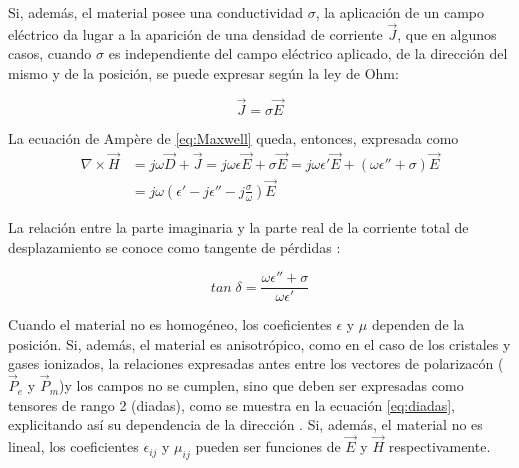 Si, además, el material posee una conductividad $\sigma$, la aplicación de un campo eléctrico da lugar a la aparición de una densidad de corriente $\vec{J}$, que en algunos casos, cuando $\sigma$ es independiente del campo eléctrico aplicado, de la dirección del mismo y de la posición, se puede expresar según la ley de Ohm:

\begin{equation}
	\label{eq:ohms_law}
	\vec{J} = \sigma \vec{E}
\end{equation}

La ecuación de Ampère de \ref{eq:Maxwell} queda, entonces, expresada como
\begin{subequations}
	\begin{align}
		\nabla \times \vec{H} & = j \omega \vec{D} + \vec{J} = j \omega \epsilon \vec{E} + \sigma \vec{E} = j \omega \epsilon' \vec{E} + (\omega \epsilon'' + \sigma)\vec{E}\\
		& = j \omega \left( \epsilon' - j\epsilon'' - j \frac{\sigma}{\omega} \right) \vec{E}
	\end{align}
\end{subequations}

La relación entre la parte imaginaria y la parte real de la corriente total de desplazamiento se conoce como tangente de pérdidas \cite{Pozar:MwEngineering}:

\begin{equation}
	tan \; \delta = \frac{\omega \epsilon'' + \sigma}{\omega \epsilon'}
\end{equation}

Cuando el material no es homogéneo, los coeficientes $\epsilon$ y $\mu$ dependen de la posición. Si, además, el material es anisotrópico, como en el caso de los cristales y gases ionizados, la relaciones expresadas antes entre los vectores de polarizacón ($\vec{P}_e$ y $\vec{P}_m$)y los campos no se cumplen, sino que deben ser expresadas como tensores de rango 2 (diadas), como se muestra en la ecuación \ref{eq:diadas}, explicitando así su dependencia de la dirección \cite{Collin:GuidedWaves}. Si, además, el material no es lineal, los coeficientes $\epsilon_{ij}$ y $\mu_{ij}$ pueden ser funciones de $\vec{E}$ y $\vec{H}$ respectivamente.

